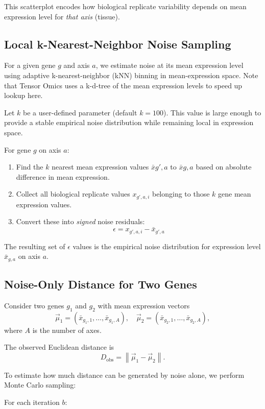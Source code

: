 \documentclass{article}
\begin{document}
This scatterplot encodes how biological replicate variability depends on mean expression level for \emph{that axis} (tissue).

\subsection{Local k-Nearest-Neighbor Noise Sampling}

For a given gene $g$ and axis $a$, we estimate noise at its mean expression level using adaptive k-nearest-neighbor (kNN) binning in mean-expression space. Note that Tensor Omics uses a k-d-tree of the mean expression levels to speed up lookup here.

Let $k$ be a user-defined parameter (default $k=100$). This value is large enough to provide a stable empirical noise distribution while remaining local in expression space.

For gene $g$ on axis $a$:

\begin{enumerate}
\item Find the $k$ nearest mean expression values $\bar{x}{g',a}$ to $\bar{x}{g,a}$ based on absolute difference in mean expression.
\item Collect all biological replicate values $x_{g',a,i}$ belonging to those $k$ gene mean expression values.
\item Convert these into \emph{signed} noise residuals:
\[
\epsilon = x_{g',a,i} - \bar{x}_{g',a}
\]
\end{enumerate}

The resulting set of $\epsilon$ values is the empirical noise distribution for expression level $\bar{x}_{g,a}$ on axis $a$.

\subsection{Noise-Only Distance for Two Genes}

Consider two genes $g_1$ and $g_2$ with mean expression vectors
\[
\vec{\mu}_1 = (\bar{x}_{g_1,1}, \ldots, \bar{x}_{g_1,A}), \quad
\vec{\mu}_2 = (\bar{x}_{g_2,1}, \ldots, \bar{x}_{g_2,A}),
\]
where $A$ is the number of axes.

The observed Euclidean distance is
\[
D_{\mathrm{obs}} = \left\| \vec{\mu}_1 - \vec{\mu}_2 \right\|.
\]

To estimate how much distance can be generated by noise alone, we perform Monte Carlo sampling:

For each iteration $b$:
\end{document}
